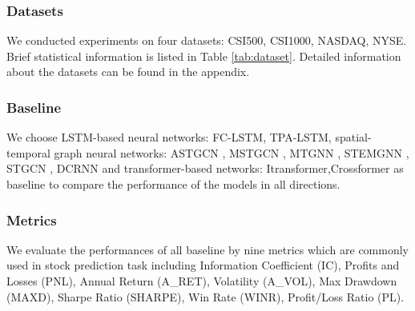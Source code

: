 \subsubsection{Datasets}
We conducted experiments on four datasets: CSI500, CSI1000, NASDAQ, NYSE. Brief statistical information is listed in Table \ref{tab:dataset}. Detailed information about the datasets can be found in the appendix.
\subsubsection{Baseline}
We choose LSTM-based neural networks: FC-LSTM\cite{FCLSTM}, TPA-LSTM\cite{TPALSTM}, spatial-temporal graph neural networks: ASTGCN \cite{ASTGCN}, MSTGCN \cite{MSTGCN}, MTGNN \cite{MTGNN}, STEMGNN \cite{stemGNN}, STGCN \cite{STGCN}, DCRNN\cite{DCRNN}	 and transformer-based networks: Itransformer\cite{itransformer},Crossformer\cite{crossformer} as baseline to compare the performance of the models in all directions.

\subsubsection{Metrics}
We evaluate the performances of all baseline by nine metrics which are commonly used in stock prediction task including Information Coefficient (IC), Profits and Losses (PNL), Annual Return (A\_RET), Volatility (A\_VOL), Max Drawdown (MAXD), Sharpe Ratio (SHARPE), Win Rate (WINR), Profit/Loss Ratio (PL).

